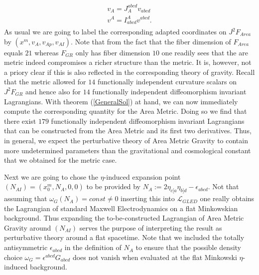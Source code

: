 \documentclass[a4paper,12pt, DIV=14, BCOR=5mm, twoside, headsepline, numbers=noenddot]{scrbook}
\begin{document}
\begin{align}
    \begin{aligned}
    v_A = J_A^{abcd}v_{abcd} \\
    v^A = I^A_{abcd}v^{abcd}.
    \end{aligned}
\end{align}
As usual we are going to label the corresponding adapted coordinates on $J^2F_{Area}$ by $(x^m,v_A,v_{Ap},v_{AI})$. 
Note that from the fact that the fiber dimension of $F_{Area}$ equals $21$ whereas $F_{GR}$ only has fiber dimension $10$ one readily sees that the are metric indeed compromises a richer structure than the metric. It is, however, not a priory clear if this is also reflected in the corresponding theory of gravity. Recall that the metric allowed for $14$ functionally independent curvature scalars on $J^2F_{GR}$ and hence also for $14$ functionally independent diffeomorphism invariant Lagrangians. With theorem (\ref{GeneralSol}) at hand, we can now immediately compute the corresponding quantity for the Area Metric. Doing so we find that there exist $179$ functionally independent diffeomorphism invariant Lagrangians that can be constructed from the Area Metric and its first two derivatives. Thus, in general, we expect the perturbative theory of Area Metric Gravity to contain more undetermined parameters than the gravitational and cosmological constant that we obtained for the metric case.


Next we are going to chose the $\eta$-induced expansion point $(N_{AI}) = (x_0^m, N_A, 0,0)$ to be provided by $N_A := 2 \eta_{c[a} \eta_{b]d} - \epsilon_{abcd}$. Not that assuming that $\omega_G(N_A) = const \neq 0$ inserting this into $\mathcal{L}_{GLED}$ one really obtains the Lagrangian of standard Maxwell Electrodynamics on a flat Minkowskian background. Thus expanding the to-be-constructed Lagrangian of Area Metric Gravity around $(N_{AI})$ serves the purpose of interpreting the result as perturbative theory around a flat spacetime. Note that we included the totally antisymmetric $\epsilon_{abcd}$ in the definition of $N_A$ to ensure that  the possible density choice $\omega_G = \epsilon^{abcd}G_{abcd}$ does not vanish when evaluated at the flat Minkowski $\eta$-induced background. 
\end{document}
